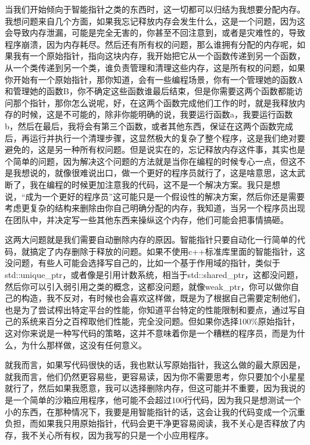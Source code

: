 当我们开始倾向于智能指针之类的东西时，这一切都可以归结为我想要分配内存。我想问题来自几个方面，如果我忘记释放内存会发生什么，这是一个问题，因为这会导致内存泄漏，可能是完全无害的，你甚至不回注意到，或者是灾难性的，导致程序崩溃，因为内存耗尽。然后还有所有权的问题，那么谁拥有分配的内存呢，如果我有一个原始指针，指向这块内存，我开始把它从一个函数传递到另一个函数，从一个类传递到另一个类，谁负责管理和清理这些内存，这是所有权的问题，如果你开始有一个原始指针，那你知道，会有一些编程场景，你有一个管理她的函数A和管理她的函数B，你不确定这些函数谁最后结束，但是你需要这两个函数都能访问那个指针，那你怎么说呢，好，在这两个函数完成他们工作的时，就是我释放内存的时候，这是不可能的，除非你能明确的说，我要运行函数a，我要运行函数b，然后在最后，我将会有第三个函数，或者其他东西，保证在这两个函数完成后，再运行并执行一个清理步骤，这显然极大的复杂了整个程序，这是我们绝对要避免的，这是另一种所有权问题。但是说实在的，忘记释放内存这件事，其实也是个简单的问题，因为解决这个问题的方法就是当你在编程的时候专心一点，但这不是我想说的，就像很难说出口，做一个更好的程序员就行了，这是啥意思，这太武断了，我在编程的时候更加注意我的代码，这不是一个解决方案。我只是想说，“成为一个更好的程序员”这可能只是一个假设性的解决方案，然后你还是需要考虑更复杂的结构来删除由你自己明确分配的内存，我知道，当另一个程序员出现在团队中，并决定写一些其他东西来操纵这个内存，他们可能会把事情搞砸。

这两大问题就是我们需要自动删除内存的原因。智能指针只要自动化一行简单的代码，就搞定了内存删除于释放的问题。如果不使用c++标准库里面的智能指针，这没问题，有些人可能会选择写自己的，比如一个基于作用域的指针，类似于{\ncodestyle std::unique_ptr}，或者像是引用计数系统，相当于{\ncodestyle std::shared_ptr}，这都没问题，然后你可以引入弱引用之类的概念，这都没问题，就像{\ncodestyle weak_ptr}，你可以做你自己的构造，我不反对，有时候也会喜欢这样做，既是为了根据自己需要定制他们，也是为了尝试榨出特定平台的性能，你知道平台特定的性能限制和要点，通过写自己的系统来百分之百榨取他们性能，完全没问题。但如果你选择100\%原始指针，这对你来说是一种写代码的策略，这并不意味着你是一个糟糕的程序员，而是为什么，为什么那样做，这没有任何意义。

就我而言，如果写代码很快的话，我也默认写原始指针，我这么做的最大原因是，就我而言，他们仍然更容易些，更容易读，因为你不需要思考，你只要加个小星星就行了，然后如果我愿意，我可以选择删除内存，但这可能并不重要，因为我说的是一个简单的沙箱应用程序，他可能不会超过100行代码，因为我只是想测试一个小的东西，在那种情况下，我要是用智能指针的话，这会让我的代码变成一个沉重负担，而如果我只用原始指针，代码会更干净更容易阅读，我不关心是否释放了内存，我不关心所有权，因为我写的只是一个小应用程序。


